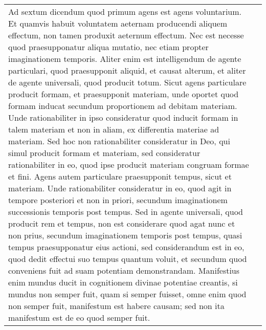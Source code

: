 \documentclass[10pt]{jsarticle} %
\begin{document}
\begin{longtable}{p{21em}p{21em}}
{\sc Ad sextum dicendum} quod primum agens est agens voluntarium. Et quamvis
 habuit voluntatem aeternam producendi aliquem effectum, non tamen
 produxit aeternum effectum. Nec est necesse quod praesupponatur aliqua
 mutatio, nec etiam propter imaginationem temporis. Aliter enim est
 intelligendum de agente particulari, quod praesupponit aliquid, et
 causat alterum, et aliter de agente universali, quod producit
 totum. Sicut agens particulare producit formam, et praesupponit
 materiam, unde oportet quod formam inducat secundum proportionem ad
 debitam materiam. Unde rationabiliter in ipso consideratur quod inducit
 formam in talem materiam et non in aliam, ex differentia materiae ad
 materiam. Sed hoc non rationabiliter consideratur in Deo, qui simul
 producit formam et materiam, sed consideratur rationabiliter in eo,
 quod ipse producit materiam congruam formae et fini. Agens autem
 particulare praesupponit tempus, sicut et materiam. Unde rationabiliter
 consideratur in eo, quod agit in tempore posteriori et non in priori,
 secundum imaginationem successionis temporis post tempus. Sed in agente
 universali, quod producit rem et tempus, non est considerare quod agat
 nunc et non prius, secundum imaginationem temporis post tempus, quasi
 tempus praesupponatur eius actioni, sed considerandum est in eo, quod
 dedit effectui suo tempus quantum voluit, et secundum quod conveniens
 fuit ad suam potentiam demonstrandam. Manifestius enim mundus ducit in
 cognitionem divinae potentiae creantis, si mundus non semper fuit, quam
 si semper fuisset, omne enim quod non semper fuit, manifestum est
 habere causam; sed non ita manifestum est de eo quod semper fuit.


\end{longtable}
\end{document}
